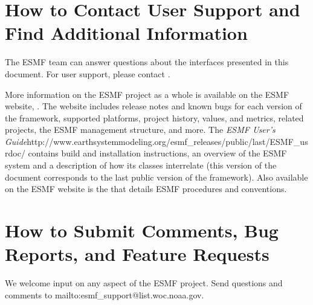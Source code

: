 \section{How to Contact User Support and Find Additional Information}
\label{sec:Support}
The ESMF team can answer questions about the interfaces presented in this 
document.  For user support, please contact 
.  

More information on the ESMF project as a whole is available on the 
ESMF website, 
\newline
{}.  
The website includes release notes and known bugs for each version of the
framework, supported platforms, project history, values, and metrics, related projects,
the ESMF management structure, and more.  The \htmladdnormallink
{{\it ESMF User's Guide}}{http://www.earthsystemmodeling.org/esmf\_releases/public/last/ESMF\_usrdoc/} contains build and installation instructions, an overview of the ESMF system and a description of 
how its classes interrelate (this version of the document corresponds to the last public version of the framework).  Also available on the ESMF website is the 
that details ESMF procedures and conventions.  
 
\section{How to Submit Comments, Bug Reports, and Feature Requests}
\label{sec:Submission}
We welcome input on any aspect of the ESMF project.  Send
questions and comments to 
\newline
{}
{mailto:esmf\_support@list.woc.noaa.gov}.






